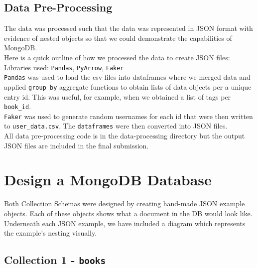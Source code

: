 \documentclass[11pt]{article}
\begin{document}
\subsection{Data Pre-Processing}
\label{sec:org500a8bc}
The data was processed such that the data was represented in JSON format with evidence of nested objects so that we could demonstrate the capabilities of MongoDB.\\
\linebreak
Here is a quick outline of how we processed the data to create JSON files:\\
Libraries used: \texttt{Pandas}, \texttt{PyArrow}, \texttt{Faker}\\
\linebreak
\texttt{Pandas} was used to load the csv files into dataframes where we merged data and applied \texttt{group by} aggregate functions to obtain lists of data objects per a unique entry id. This was useful, for example, when we obtained a list of tags per \texttt{book\_id}.\\
\linebreak
\texttt{Faker} was used to generate random usernames for each id that were then written to \texttt{user\_data.csv}. The \texttt{dataframes} were then converted into JSON files.\\
\linebreak
All data pre-processing code is in the data-processing directory but the output JSON files are included in the final submission.
\section{Design a MongoDB Database}
\label{sec:orge5442e2}
Both Collection Schemas were designed by creating hand-made JSON example objects. Each of these objects shows what a document in the DB would look like. Underneath each JSON example, we have included a diagram which represents the example's nesting visually.
\subsection{Collection 1 - \texttt{books}}
\label{sec:orgc0b7682}
\end{document}
